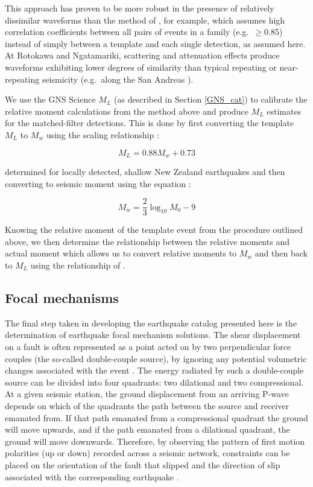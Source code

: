 This approach has proven to be more robust in the presence of relatively dissimilar waveforms than the method of \citet{Rubinstein_2010}, for example, which assumes high correlation coefficients between all pairs of events in a family (e.g.\ $\geq$0.85) instead of simply between a template and each single detection, as assumed here. At Rotokawa and Ngatamariki, scattering and attenuation effects produce waveforms exhibiting lower degrees of similarity than typical repeating or near-repeating seismicity (e.g.\ along the San Andreas \citep{Rubinstein_2010}).

We use the GNS Science $M_{L}$ (as described in Section \ref{GNS_cat}) to calibrate the relative moment calculations from the method above and produce $M_{L}$ estimates for the matched-filter detections. This is done by first converting the template $M_{L}$ to $M_{w}$ using the scaling relationship \citep{Ristau_2009}:

\begin{equation}
M_{L} = 0.88M_{w} + 0.73
\end{equation}

determined for locally detected, shallow New Zealand earthquakes and then converting to seismic moment using the equation \citep{Hanks_1979}:

\begin{equation}
M_w = \frac{2}{3}\log_{10}M_{0} - 9
\end{equation}

Knowing the relative moment of the template event from the procedure outlined above, we then determine the relationship between the relative moments and actual moment which allows us to convert relative moments to $M_w$ and then back to $M_L$ using the relationship of \citet{Ristau_2009}.

\subsection{Focal mechanisms}
The final step taken in developing the earthquake catalog presented here is the determination of earthquake focal mechanism solutions. The shear displacement on a fault is often represented as a point acted on by two perpendicular force couples (the so-called double-couple source), by ignoring any potential volumetric changes associated with the event \citep{stein_2000}. The energy radiated by such a double-couple source can be divided into four quadrants: two dilational and two compressional. At a given seismic station, the ground displacement from an arriving P-wave depends on which of the quadrants the path between the source and receiver emanated from. If that path emanated from a compressional quadrant the ground will move upwards, and if the path emanated from a dilational quadrant, the ground will move downwards. Therefore, by observing the pattern of first motion polarities (up or down) recorded across a seismic network, constraints can be placed on the orientation of the fault that slipped and the direction of slip associated with the corresponding earthquake \citep{stein_2000}.

